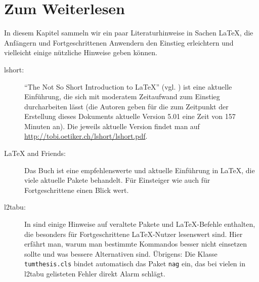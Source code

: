
\chapter{Zum Weiterlesen}
\label{ch:reader}

In diesem Kapitel sammeln wir ein paar Literaturhinweise in Sachen \LaTeX, die
Anfängern und Fortgeschrittenen Anwendern den Einstieg erleichtern und
vielleicht einige nützliche Hinweise geben können.
\begin{description}
\item[lshort:] \enquote{The Not So Short Introduction to \LaTeX}
  (vgl. \cite{l2short}) ist eine aktuelle Einführung, die sich mit moderatem
  Zeitaufwand zum Einstieg durcharbeiten lässt (die Autoren geben für die zum
  Zeitpunkt der Erstellung dieses Dokuments aktuelle Version 5.01 eine Zeit von
  157 Minuten an). Die jeweils aktuelle Version findet man auf
  \url{http://tobi.oetiker.ch/lshort/lshort.pdf}.
\item[\LaTeX{} and Friends:] Das Buch \cite{vanDongen2012} ist eine
  empfehlenswerte und aktuelle Einführung in  \LaTeX, die viele aktuelle Pakete
  behandelt. Für Einsteiger wie auch für Fortgeschrittene einen Blick wert.
\item[l2tabu:] In \cite{l2tabu} sind einige Hinweise auf veraltete Pakete und
  \LaTeX-Befehle enthalten, die besonders für Fortgeschrittene \LaTeX-Nutzer
  lesenswert sind. Hier erfährt man, warum man bestimmte Kommandos besser nicht
  einsetzen sollte und was bessere Alternativen sind. Übrigens: Die Klasse
  \texttt{tumthesis.cls} bindet automatisch das Paket \texttt{nag} ein, das bei
  vielen in l2tabu gelisteten Fehler direkt Alarm schlägt.
\end{description}

